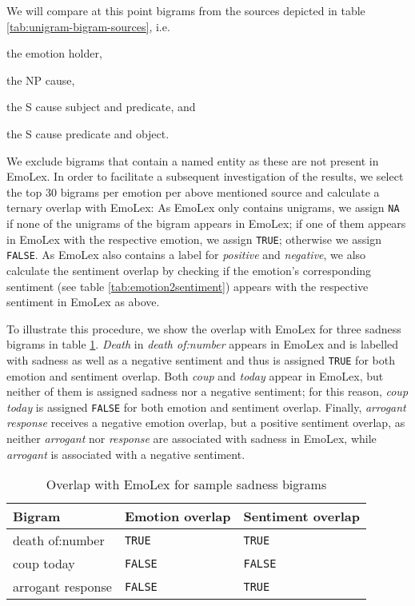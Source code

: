 \begin{inparaenum} We will compare at this point bigrams from the sources depicted in table \ref{tab:unigram-bigram-sources}, i.e. \item the emotion holder, \item the NP cause, \item the S cause subject and predicate, and \item the S cause predicate and object. \end{inparaenum} We exclude bigrams that contain a named entity as these are not present in EmoLex. In order to facilitate a subsequent investigation of the results, we select the top 30 bigrams per emotion per above mentioned source and calculate a ternary overlap with EmoLex: As EmoLex only contains unigrams, we assign \texttt{NA} if none of the unigrams of the bigram appears in EmoLex; if one of them appears in EmoLex with the respective emotion, we assign \texttt{TRUE}; otherwise we assign \texttt{FALSE}. As EmoLex also contains a label for \textit{positive} and \textit{negative}, we also calculate the sentiment overlap by checking if the emotion's corresponding sentiment (see table \ref{tab:emotion2sentiment}) appears with the respective sentiment in EmoLex as above.

To illustrate this procedure, we show the overlap with EmoLex for three sadness bigrams in table \ref{tab:emolex-overlap-example}. \textit{Death} in \textit{death of:number} appears in EmoLex and is labelled with sadness as well as a negative sentiment and thus is assigned \texttt{TRUE} for both emotion and sentiment overlap. Both \textit{coup} and \textit{today} appear in EmoLex, but neither of them is assigned sadness nor a negative sentiment; for this reason, \textit{coup today} is assigned \texttt{FALSE} for both emotion and sentiment overlap. Finally, \textit{arrogant response} receives a negative emotion overlap, but a positive sentiment overlap, as neither \textit{arrogant} nor \textit{response} are associated with sadness in EmoLex, while \textit{arrogant} is associated with a negative sentiment.

\begin{table}[]
\centering
\begin{tabular}{l|l|l}
{\bf Bigram} & {\bf Emotion overlap} & {\bf Sentiment overlap} \\\hline
death of:number & \texttt{TRUE} & \texttt{TRUE} \\
coup today & \texttt{FALSE} & \texttt{FALSE} \\
arrogant response & \texttt{FALSE} & \texttt{TRUE}
\end{tabular}
\caption{Overlap with EmoLex for sample sadness bigrams}
\label{tab:emolex-overlap-example}
\end{table}

